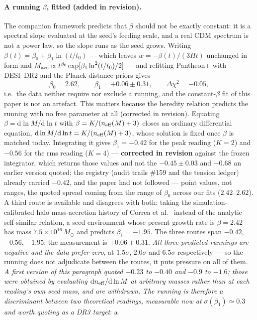 \documentclass[11pt]{article}
\begin{document}
\paragraph{A running $\beta$, fitted (added in revision).} The companion framework predicts that
$\beta$ should not be exactly constant: it is a spectral slope evaluated at the seed's feeding
scale, and a real CDM spectrum is not a power law, so the slope runs as the seed grows. Writing
$\beta(t) = \beta_0 + \beta_1\ln(t/t_0)$ --- which leaves $w = -\beta(t)/(3Ht)$ unchanged in form
and $M_{\rm acc} \propto t^{\beta_0}\exp[\beta_1\ln^2(t/t_0)/2]$ --- and refitting Pantheon+ with
DESI~DR2 and the Planck distance priors gives
\[
\beta_0 = 2.62, \qquad \beta_1 = +0.06 \pm 0.31, \qquad \Delta\chi^2 = -0.05,
\]
i.e.\ the data neither require nor exclude a running, and the constant-$\beta$ fit of this paper is
not an artefact. This matters because the heredity relation predicts the running with no free parameter at all
(corrected in revision). Equating $\beta = \mathrm{d}\ln M/\mathrm{d}\ln t$ with
$\beta = K/(n_{\rm eff}(M)+3)$ closes an ordinary differential equation,
$\mathrm{d}\ln M/\mathrm{d}\ln t = K/(n_{\rm eff}(M)+3)$, whose solution is fixed once $\beta$ is
matched today. Integrating it gives $\beta_1 = -0.42$ for the peak reading ($K=2$) and $-0.56$ for the
rms reading ($K=4$) --- \textbf{corrected in revision} against the frozen integrator, which returns those values and not the $-0.45 \pm 0.03$ and $-0.68$ an earlier version quoted; the registry (audit trails \#159 and the tension ledger) already carried $-0.42$, and the paper had not followed --- point values, not ranges, the quoted spread coming from the range of
$\beta_0$ across our fits ($2.42$--$2.62$). A third route is available and disagrees with both:
taking the simulation-calibrated halo mass-accretion history of Correa et al.\ \cite{Correa2015}
instead of the analytic self-similar relation, a seed environment whose present growth rate is
$\beta = 2.42$ has mass $7.5\times10^{16}\,M_\odot$ and predicts $\beta_1 = -1.95$. The three
routes span $-0.42$, $-0.56$, $-1.95$; the measurement is $+0.06 \pm 0.31$. \emph{All three
predicted runnings are negative and the data prefer zero}, at $1.5\sigma$, $2.0\sigma$ and
$6.5\sigma$ respectively --- so the running does not adjudicate between the routes, it puts
pressure on all of them. \emph{A first version of this paragraph
quoted $-0.23$ to $-0.40$ and $-0.9$ to $-1.6$; those were obtained by evaluating
$\mathrm{d}n_{\rm eff}/\mathrm{d}\ln M$ at arbitrary masses rather than at each reading's own seed
mass, and are withdrawn.} \emph{The running is therefore a discriminant between two theoretical
readings, measurable now at $\sigma(\beta_1) \simeq 0.3$ and worth quoting as a DR3 target}: a
\end{document}
